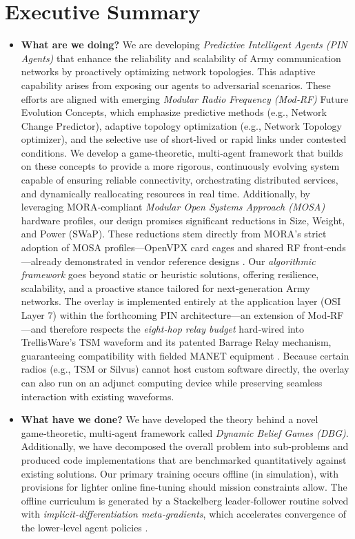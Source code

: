 \documentclass[doc.tex]{subfiles}
\begin{document}
\section{Executive Summary}
\begin{tcolorbox}
\begin{itemize}
    \item \textbf{What are we doing?}
    We are developing \emph{Predictive Intelligent Agents (PIN Agents)} that enhance the reliability and scalability of Army communication networks by proactively optimizing network topologies. This adaptive capability arises from exposing our agents to adversarial scenarios. These efforts are aligned with emerging \emph{Modular Radio Frequency (Mod‑RF)} Future Evolution Concepts, which emphasize predictive methods (e.g., Network Change Predictor), adaptive topology optimization (e.g., Network Topology optimizer), and the selective use of short‑lived or rapid links under contested conditions. We develop a game‑theoretic, multi‑agent framework that builds on these concepts to provide a more rigorous, continuously evolving system capable of ensuring reliable connectivity, orchestrating distributed services, and dynamically reallocating resources in real time. Additionally, by leveraging MORA‑compliant \emph{Modular Open Systems Approach (MOSA)} hardware profiles, our design promises significant reductions in Size, Weight, and Power (SWaP). These reductions stem directly from MORA’s strict adoption of MOSA profiles—OpenVPX card cages and shared RF front‑ends—already demonstrated in vendor reference designs \cite{curtisswrightMORA2025}. Our \emph{algorithmic framework} goes beyond static or heuristic solutions, offering resilience, scalability, and a proactive stance tailored for next‑generation Army networks. The overlay is implemented entirely at the application layer (OSI Layer 7) within the forthcoming PIN architecture—an extension of Mod‑RF—and therefore respects the \emph{eight‑hop relay budget} hard‑wired into TrellisWare’s TSM waveform and its patented Barrage Relay mechanism, guaranteeing compatibility with fielded MANET equipment \cite{talarico2014unicast, trellisware2022ghost,US8873391B2}. Because certain radios (e.g., TSM or Silvus) cannot host custom software directly, the overlay can also run on an adjunct computing device while preserving seamless interaction with existing waveforms.

    \item \textbf{What have we done?}
    We have developed the theory behind a novel game‑theoretic, multi‑agent framework called \emph{Dynamic Belief Games (DBG)}. Additionally, we have decomposed the overall problem into sub‑problems and produced code implementations that are benchmarked quantitatively against existing solutions. Our primary training occurs offline (in simulation), with provisions for lighter online fine‑tuning should mission constraints allow. The offline curriculum is generated by a Stackelberg leader‑follower routine solved with \emph{implicit‑differentiation meta‑gradients}, which accelerates convergence of the lower‑level agent policies \cite{fiez2020stackelberg}.


\end{itemize}
\end{tcolorbox}
\end{document}
